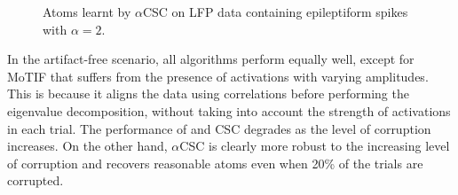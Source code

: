 
\begin{figure}[b]
    \centering
    \begin{minipage}{\linewidth}
        \begin{minipage}{0.75\textwidth}
        \end{minipage}
        \hfill
        \begin{minipage}{0.23\textwidth}
            \caption[Atoms learnt by $\alpha$CSC on LFP data containing epileptiform spikes with $\alpha=2$.]{Atoms learnt by $\alpha$CSC on LFP data containing epileptiform spikes with $\alpha=2$.}
        \end{minipage}
    \end{minipage}
\end{figure}

In the artifact-free scenario, all algorithms perform equally well, except for MoTIF that suffers from the presence of activations with varying amplitudes. This is because it aligns the data using correlations before performing the eigenvalue decomposition, without taking into account the strength of activations in each trial. The performance of \citet{brockmeier2016learning} and CSC degrades as the level of corruption increases. On the other hand, $\alpha$CSC is clearly more robust to the increasing level of corruption and recovers reasonable atoms even when 20\% of the trials are corrupted. 




